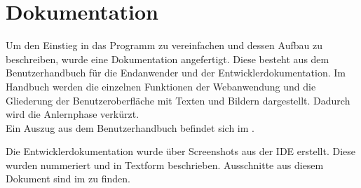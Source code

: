 \section{Dokumentation}
\label{sec:Dokumentation}
Um den Einstieg in das Programm zu vereinfachen und dessen Aufbau zu beschreiben,
wurde eine Dokumentation angefertigt. Diese besteht aus dem Benutzerhandbuch für
die Endanwender und der Entwicklerdokumentation. Im Handbuch werden die einzelnen
Funktionen der Webanwendung und die Gliederung der Benutzeroberfläche mit Texten
und Bildern dargestellt. Dadurch wird die Anlernphase verkürzt.\\
Ein Auszug aus dem Benutzerhandbuch befindet sich im .

Die Entwicklerdokumentation wurde über Screenshots aus der \acs{IDE} erstellt.
Diese wurden nummeriert und in Textform beschrieben. Ausschnitte aus diesem
Dokument sind im  zu finden.

